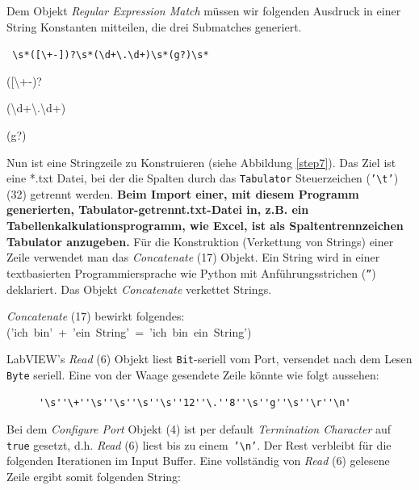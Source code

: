 \noindent Dem Objekt \textit{Regular Expression Match} müssen wir folgenden Ausdruck in einer String Konstanten mitteilen, die drei Submatches generiert.

\begin{center} %
\texttt{
\textbackslash s*([\textbackslash +-])?\textbackslash s*(\textbackslash d+\textbackslash .\textbackslash d+)\textbackslash s*(g?)\textbackslash s*
}
\end{center}

\begin{description}  %
\singlespacing
\item[Submatch 1] ([\textbackslash +-)?
\item[Submatch 2] (\textbackslash d+\textbackslash .\textbackslash d+)
\item[Submatch 3] (g?)
\end{description}

\noindent Nun ist eine Stringzeile zu Konstruieren (siehe Abbildung \ref{step7}). Das Ziel ist eine *.txt Datei, bei der die Spalten durch das \texttt{Tabulator} Steuerzeichen (\texttt{'\textbackslash t'}) (32) getrennt werden. \textbf{Beim Import einer, mit diesem Programm generierten, Ta\-bu\-lator-getrennt.txt-Datei in, z.B. ein Tabellenkalkulationsprogramm, wie Excel, ist als Spaltentrennzeichen Tabulator anzugeben.} Für die Konstruktion (Verkettung von Strings) einer Zeile verwendet man das \textit{Concatenate} (17) Objekt. Ein String wird in einer textbasierten Programmiersprache wie Python mit Anführungsstrichen (\texttt{''}) deklariert. Das Objekt \textit{Concatenate} verkettet Strings.

\begin{center}
\textit{Concatenate} (17) bewirkt folgendes: \mbox{(\mbox{'ich bin'} + \mbox{'ein String'} = \mbox{'ich bin ein String'})}
\end{center}  

\noindent LabVIEW's \textit{Read} (6) Objekt liest \texttt{Bit}-seriell vom Port, versendet nach dem Lesen \texttt{Byte} seriell. Eine von der Waage gesendete Zeile könnte wie folgt aussehen:

\begin{figure}[h!] %
\centering
\begin{BVerbatim}
'\s''\+''\s''\s''\s''\s''12''\.''8''\s''g''\s''\r''\n'
\end{BVerbatim}
\end{figure}


\noindent Bei dem \textit{Configure Port} Objekt (4) ist per default\textit{ Termination Character} auf\, \texttt{true} gesetzt, d.h. \textit{Read} (6) liest bis zu einem\, \texttt{'\textbackslash n'}. Der Rest verbleibt für die folgenden Iterationen im Input Buffer. Eine vollständig von \textit{Read} (6) gelesene Zeile ergibt somit folgenden String:


